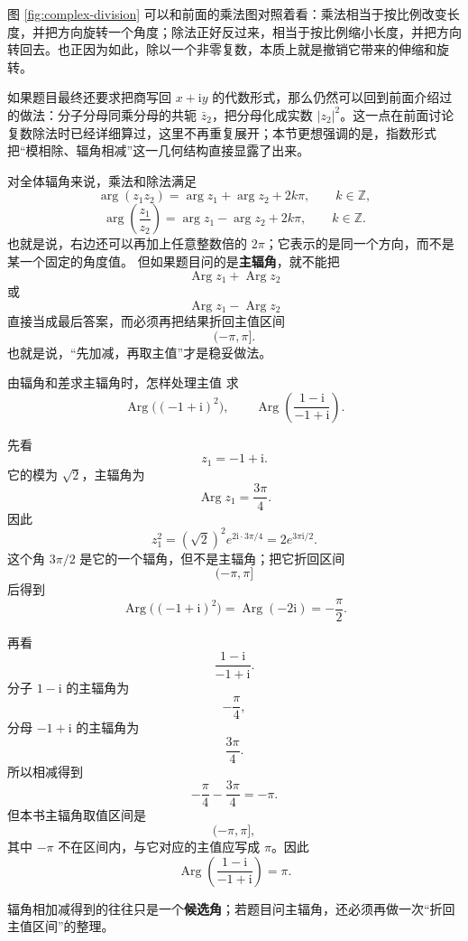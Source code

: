 图 \ref{fig:complex-division} 可以和前面的乘法图对照着看：乘法相当于按比例改变长度，并把方向旋转一个角度；除法正好反过来，相当于按比例缩小长度，并把方向转回去。也正因为如此，除以一个非零复数，本质上就是撤销它带来的伸缩和旋转。

如果题目最终还要求把商写回 $x+\mathrm{i}y$ 的代数形式，那么仍然可以回到前面介绍过的做法：分子分母同乘分母的共轭 $\bar z_2$，把分母化成实数 $|z_2|^2$。这一点在前面讨论复数除法时已经详细算过，这里不再重复展开；本节更想强调的是，指数形式把``模相除、辐角相减''这一几何结构直接显露了出来。

\begin{jinshi}[辐角公式与主辐角不要混用]
对全体辐角来说，乘法和除法满足
\[
\arg(z_1z_2)=\arg z_1+\arg z_2+2k\pi,\qquad k\in\mathbb{Z},
\]
\[
\arg\left(\frac{z_1}{z_2}\right)=\arg z_1-\arg z_2+2k\pi,\qquad k\in\mathbb{Z}.
\]
也就是说，右边还可以再加上任意整数倍的 $2\pi$；它表示的是同一个方向，而不是某一个固定的角度值。
但如果题目问的是\textbf{主辐角}，就不能把
\[
\operatorname{Arg}z_1+\operatorname{Arg}z_2
\]
或
\[
\operatorname{Arg}z_1-\operatorname{Arg}z_2
\]
直接当成最后答案，而必须再把结果折回主值区间
\[
(-\pi,\pi].
\]
也就是说，``先加减，再取主值''才是稳妥做法。
\end{jinshi}

\begin{lizi}{由辐角和差求主辐角时，怎样处理主值}{}
求
\[
\operatorname{Arg}\bigl((-1+\mathrm{i})^2\bigr),\qquad
\operatorname{Arg}\left(\frac{1-\mathrm{i}}{-1+\mathrm{i}}\right).
\]

\begin{jie}
先看
\[
z_1=-1+\mathrm{i}.
\]
它的模为 $\sqrt{2}$，主辐角为
\[
\operatorname{Arg}z_1=\frac{3\pi}{4}.
\]
因此
\[
z_1^2=(\sqrt{2})^2e^{2\mathrm{i}\cdot 3\pi/4}=2e^{3\pi\mathrm{i}/2}.
\]
这个角 $3\pi/2$ 是它的一个辐角，但不是主辐角；把它折回区间
\[
(-\pi,\pi]
\]
后得到
\[
\operatorname{Arg}\bigl((-1+\mathrm{i})^2\bigr)=\operatorname{Arg}(-2\mathrm{i})=-\frac{\pi}{2}.
\]

再看
\[
\frac{1-\mathrm{i}}{-1+\mathrm{i}}.
\]
分子 $1-\mathrm{i}$ 的主辐角为
\[
-\frac{\pi}{4},
\]
分母 $-1+\mathrm{i}$ 的主辐角为
\[
\frac{3\pi}{4}.
\]
所以相减得到
\[
-\frac{\pi}{4}-\frac{3\pi}{4}=-\pi.
\]
但本书主辐角取值区间是
\[
(-\pi,\pi],
\]
其中 $-\pi$ 不在区间内，与它对应的主值应写成 $\pi$。因此
\[
\operatorname{Arg}\left(\frac{1-\mathrm{i}}{-1+\mathrm{i}}\right)=\pi.
\]

辐角相加减得到的往往只是一个\textbf{候选角}；若题目问主辐角，还必须再做一次``折回主值区间''的整理。
\end{jie}
\end{lizi}

